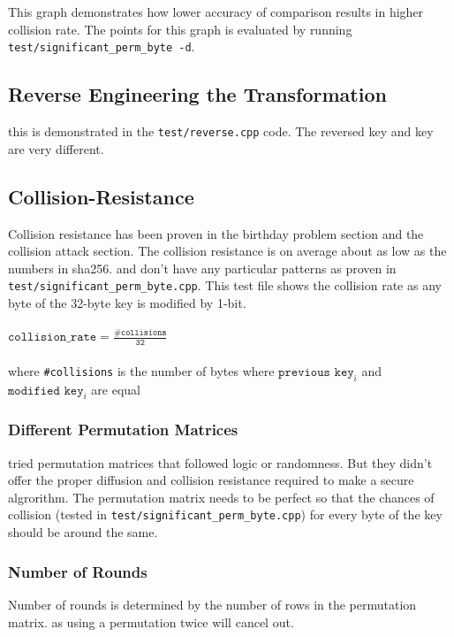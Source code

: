 \documentclass[fleqn, a4paper,12pt]{article}
\begin{document}
This graph demonstrates how lower accuracy of comparison results in higher collision rate. The points for this graph is evaluated by running \texttt{test/significant\_perm\_byte -d}.
\\
\subsection{Reverse Engineering the Transformation}

this is demonstrated in the \texttt{test/reverse.cpp} code. The reversed key and key are very different.

\subsection{Collision-Resistance}

Collision resistance has been proven in the birthday problem section and the collision attack section. The collision resistance is on average about as low as the numbers in sha256. and don't have any particular patterns as proven in \texttt{test/significant\_perm\_byte.cpp}. This test file shows the collision rate as any byte of the 32-byte key is modified by 1-bit.
\\\\
$\texttt{collision\_rate} = \frac{\texttt{\#collisions}}{\texttt{32}}$\\
 \\ where \texttt{\#collisions} is the number of bytes where $\texttt{previous key}_i$ and $\texttt{modified key}_i$ are equal

\subsubsection{Different Permutation Matrices}

tried permutation matrices that followed logic or randomness. But they didn't offer the proper diffusion and collision resistance required to make a secure algrorithm. The permutation matrix needs to be perfect so that the chances of collision (tested in \texttt{test/significant\_perm\_byte.cpp}) for every byte of the key should be around the same.

\subsubsection{Number of Rounds}

Number of rounds is determined by the number of rows in the permutation matrix. as using a permutation twice will cancel out.
\end{document}
